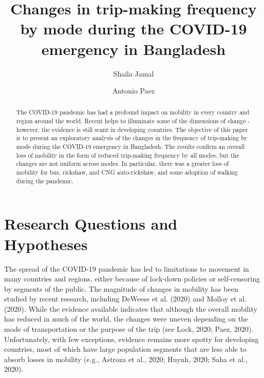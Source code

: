 \documentclass[]{elsarticle} %
\begin{document}
\begin{frontmatter}

  \title{Changes in trip-making frequency by mode during the COVID-19 emergency
in Bangladesh}
    \author[McMaster University]{Shaila Jamal}
    \author[McMaster University]{Antonio Paez}
      \address[McMaster University]{School of Earth, Environment and Society, McMaster University, Hamilton,
ON, L8S 4K1, Canada}
  
  \begin{abstract}
  The COVID-19 pandemic has had a profound impact on mobility in every
  country and region around the world. Recent helps to illuminate some of
  the dimensions of change - however, the evidence is still scant in
  developing countries. The objective of this paper is to present an
  exploratory analysis of the changes in the frequency of trip-making by
  mode during the COVID-19 emergency in Bangladesh. The results confirm an
  overall loss of mobility in the form of reduced trip-making frequency by
  all modes, but the changes are not uniform across modes. In particular,
  there was a greater loss of mobility for bus, rickshaw, and CNG
  auto-rickshaw, and some adoption of walking during the pandemic.
  \end{abstract}
  
 \end{frontmatter}

\hypertarget{research-questions-and-hypotheses}{%
\section{Research Questions and
Hypotheses}\label{research-questions-and-hypotheses}}

The spread of the COVID-19 pandemic has led to limitations to movement
in many countries and regions, either because of lock-down policies or
self-censoring by segments of the public. The magnitude of changes in
mobility has been studied by recent research, including DeWeese et al.
(2020) and Molloy et al. (2020). While the evidence available indicates
that although the overall mobility has reduced in much of the world, the
changes were uneven depending on the mode of transportation or the
purpose of the trip (see Lock, 2020; Paez, 2020). Unfortunately, with
few exceptions, evidence remains more spotty for developing countries,
most of which have large population segments that are less able to
absorb losses in mobility (e.g., Astroza et al., 2020; Huynh, 2020; Saha
et al., 2020).
\end{document}
